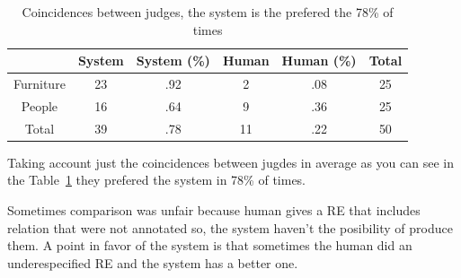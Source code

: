 

\begin{table}[h!]
\begin{center}
\begin{tabular}{|c|c|c|c|c|c|}
\hline
           & System & System (\%) & Human & Human (\%) & Total\\
\hline
Furniture & 23  & .92 &  2 & .08  & 25 \\
People    & 16  & .64 & 9  & .36 & 25 \\
\hline
Total     & 39  & .78    & 11 & .22 & 50  \\
\hline
\end{tabular}
\vspace*{.1cm}
\caption{Coincidences between judges, the system is the prefered the 78\% of times} 
\label{system-better}
\end{center}
\end{table}
\vspace*{-.9cm}
Taking account just the coincidences between jugdes in average as you can see in the Table~\ref{system-better} they prefered the system in 78\% of times.

Sometimes comparison was unfair because human gives a RE that includes relation that were not annotated so, the system haven't the posibility of produce them. A point in favor of the system is that sometimes the human did an underespecified RE and the system has a better one.\\


